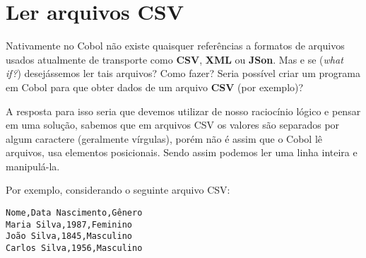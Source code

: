 \section{Ler arquivos CSV}
Nativamente no Cobol não existe quaisquer referências a formatos de arquivos usados atualmente de transporte como \textbf{CSV}, \textbf{XML} ou \textbf{JSon}. Mas e se (\textit{what if?}) desejássemos ler tais arquivos? Como fazer? Seria possível criar um programa em Cobol para que obter dados de um arquivo \textbf{CSV} (por exemplo)?

A resposta para isso seria que devemos utilizar de nosso raciocínio lógico e pensar em uma solução, sabemos que em arquivos CSV os valores são separados por algum caractere (geralmente vírgulas), porém não é assim que o Cobol lê arquivos, usa elementos posicionais. Sendo assim podemos ler uma linha inteira e manipulá-la.

Por exemplo, considerando o seguinte arquivo CSV:
\begin{lstlisting}[]
Nome,Data Nascimento,Gênero
Maria Silva,1987,Feminino
João Silva,1845,Masculino
Carlos Silva,1956,Masculino
\end{lstlisting}

